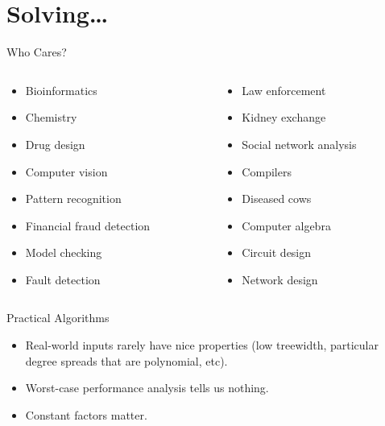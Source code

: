 \documentclass{beamer}
\begin{document}
\section{Solving\ldots}

\begin{frame}{Who Cares?}
    \begin{columns}
        \begin{column}{0.45\textwidth}
            \begin{itemize}
                \item Bioinformatics
                \item Chemistry
                \item Drug design
                \item Computer vision
                \item Pattern recognition
                \item Financial fraud detection
                \item Model checking
                \item Fault detection
            \end{itemize}
        \end{column}
        \begin{column}{0.45\textwidth}
            \begin{itemize}
                \item Law enforcement
                \item Kidney exchange
                \item Social network analysis
                \item Compilers
                \item Diseased cows
                \item Computer algebra
                \item Circuit design
                \item Network design
            \end{itemize}
        \end{column}
    \end{columns}
\end{frame}

\begin{frame}{Practical Algorithms}
    \begin{itemize}
        \item Real-world inputs rarely have nice properties (low treewidth, particular degree
            spreads that are polynomial, etc).

        \item Worst-case performance analysis tells us nothing.

        \item Constant factors matter.
    \end{itemize}
\end{frame}
\end{document}
